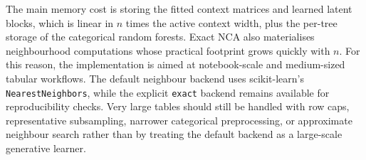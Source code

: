 The main memory cost is storing the fitted context matrices and learned latent
blocks, which is linear in $n$ times the active context width, plus the
per-tree storage of the categorical random forests. Exact NCA also materialises
neighbourhood computations whose practical footprint grows quickly with $n$.
For this reason, the implementation is aimed at notebook-scale and
medium-sized tabular workflows. The default neighbour backend uses
scikit-learn's \texttt{NearestNeighbors}, while the explicit \texttt{exact}
backend remains available for reproducibility checks. Very large tables should
still be handled with row caps, representative subsampling, narrower
categorical preprocessing, or approximate neighbour search rather than by
treating the default backend as a large-scale generative learner.
